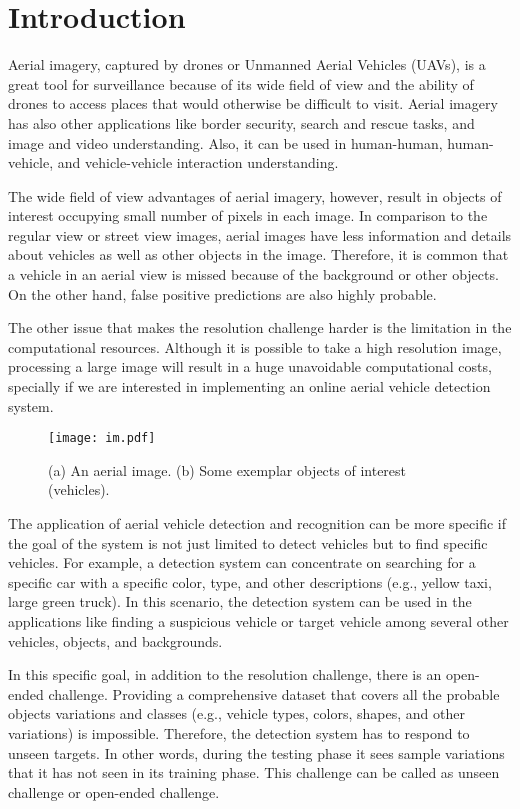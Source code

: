 \documentclass[conference]{IEEEtran}
\begin{document}
\IEEEpeerreviewmaketitle



\section{Introduction}

Aerial imagery, captured by drones or Unmanned Aerial Vehicles (UAVs), is a great tool for surveillance because of its wide field of view and the ability of drones to access places that would otherwise be difficult to visit. Aerial imagery has also other applications like border security, search and rescue tasks, and image and video understanding. Also, it can be used in human-human, human-vehicle, and vehicle-vehicle interaction understanding.

The wide field of view advantages of aerial imagery, however, result in objects of interest occupying small number of pixels in each image. In comparison to the regular view or street view images, aerial images have less information and details about vehicles as well as other objects in the image. Therefore, it is common that a vehicle in an aerial view is missed because of the background or other objects. On the other hand, false positive predictions are also highly probable.

The other issue that makes the resolution challenge harder is the limitation in the computational resources. Although it is possible to take a high resolution image, processing a large image will result in a huge unavoidable computational costs, specially if we are interested in implementing an online aerial vehicle detection system.
\begin{figure}[!t]
\centering
\texttt{[image: im.pdf]}\\
\caption{(a) An aerial image. (b) Some exemplar objects of interest (vehicles).}
\label{fig_graph2}
\end{figure}

The application of aerial vehicle detection and recognition can be more specific if the goal of the system is not just limited to detect vehicles but to find specific vehicles. For example, a detection system can concentrate on searching for a specific car with a specific color, type, and other descriptions (e.g., yellow taxi, large green truck). In this scenario, the detection system can be used in the applications like finding a suspicious vehicle or target vehicle among several other vehicles, objects, and backgrounds.

In this specific goal, in addition to the resolution challenge, there is an open-ended challenge. Providing a comprehensive dataset that covers all the probable objects variations and classes (e.g., vehicle types, colors, shapes, and other variations) is impossible. Therefore, the detection system has to respond to unseen targets. In other words, during the testing phase it sees sample variations that it has not seen in its training phase. This challenge can be called as unseen challenge or open-ended challenge.
\end{document}
